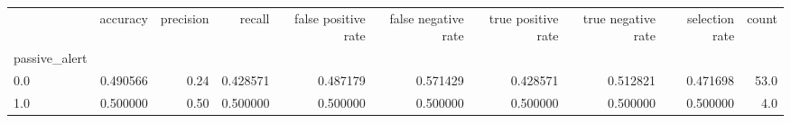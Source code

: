 \begin{tabular}{lrrrrrrrrr}
\toprule
{} &  accuracy &  precision &    recall &  false positive rate &  false negative rate &  true positive rate &  true negative rate &  selection rate &  count \\
passive\_alert &           &            &           &                      &                      &                     &                     &                 &        \\
\midrule
0.0           &  0.490566 &       0.24 &  0.428571 &             0.487179 &             0.571429 &            0.428571 &            0.512821 &        0.471698 &   53.0 \\
1.0           &  0.500000 &       0.50 &  0.500000 &             0.500000 &             0.500000 &            0.500000 &            0.500000 &        0.500000 &    4.0 \\
\bottomrule
\end{tabular}
